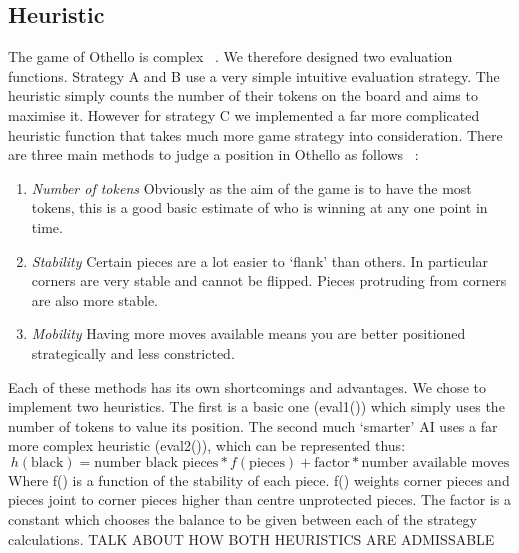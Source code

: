 \documentclass[12pt]{article}
\begin{document}
\subsection{Heuristic}
The game of Othello is complex ~\cite{post}. We therefore designed two evaluation functions. Strategy A and B use a very simple intuitive evaluation strategy. The heuristic simply counts the number of their tokens on the board and aims to maximise it. However for strategy C we implemented a far more complicated heuristic function that takes much more game strategy into consideration. There are three main methods to judge a position in Othello as follows ~\cite{strategy}:
\begin{enumerate}
\item \emph{Number of tokens} Obviously as the aim of the game is to have the most tokens, this is a good basic estimate of who is winning at any one point in time.
\item \emph{Stability} Certain pieces are a lot easier to `flank' than others. In particular corners are very stable and cannot be flipped. Pieces protruding from corners are also more stable.
\item \emph{Mobility} Having more moves available means you are better positioned strategically and less constricted.
\end{enumerate}
Each of these methods has its own shortcomings and advantages. We chose to implement two heuristics. The first is a basic one (eval1()) which simply uses the number of tokens to value its position. The second much `smarter' AI uses a far more complex heuristic (eval2()), which can be represented thus:
\begin{equation}
h(\mbox{black}) = \mbox{number black pieces}*f(\mbox{pieces}) + \mbox{factor}*\mbox{number available moves}
\end{equation}
Where f() is a function of the stability of each piece. f() weights corner pieces and pieces joint to corner pieces higher than centre unprotected pieces. The factor is a constant which chooses the balance to be given between each of the strategy calculations.
TALK ABOUT HOW BOTH HEURISTICS ARE ADMISSABLE
\end{document}
